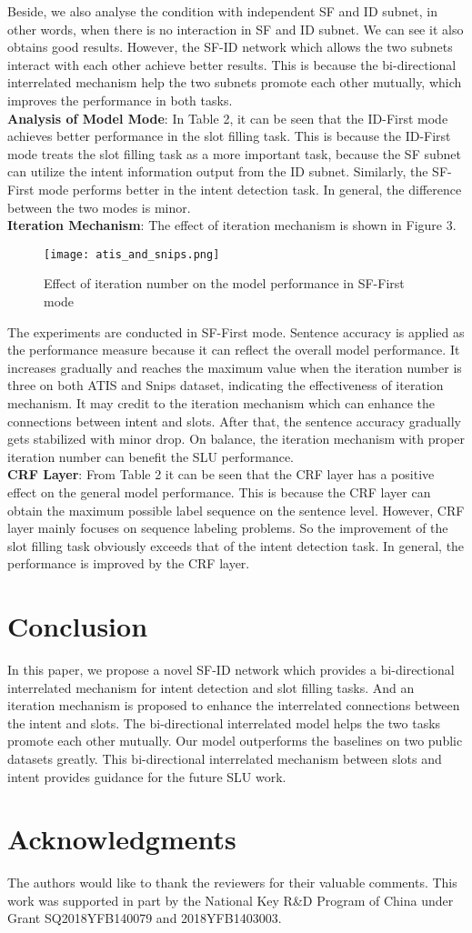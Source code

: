 \documentclass[11pt,a4paper]{article}
\begin{document}
Beside, we also analyse the condition with independent SF and ID subnet, in other words, when there is no interaction in SF and ID subnet. We can see it also obtains good results. However, the SF-ID network which allows the two subnets interact with each other achieve better results. This is because the bi-directional interrelated mechanism help the two subnets promote each other mutually, which improves the performance in both tasks.\\
\textbf{Analysis of Model Mode}: In Table 2, it can be seen that the ID-First mode achieves better performance in the slot filling task. This is because the ID-First mode treats the slot filling task as a more important task, because the SF subnet can utilize the intent information output from the ID subnet. Similarly, the SF-First mode performs better in the intent detection task. In general, the difference between the two modes is minor.\\
\textbf{Iteration Mechanism}: The effect of iteration mechanism is shown in Figure 3. 
\begin{figure}
	\centering
	\texttt{[image: atis\_and\_snips.png]}
	\caption{\label{fig:hist}Effect of iteration number on the model performance in SF-First mode}
\end{figure}
The experiments are conducted in SF-First mode. Sentence accuracy is applied as the performance measure because it can reflect the overall model performance. It increases gradually and reaches the maximum value when the iteration number is three on both ATIS and Snips dataset, indicating the effectiveness of iteration mechanism. It may credit to the iteration mechanism which can enhance the connections between intent and slots. After that, the sentence accuracy gradually gets stabilized with minor drop. On balance, the iteration mechanism with proper iteration number can benefit the SLU performance.\\
\textbf{CRF Layer}: From Table 2 it can be seen that the CRF layer has a positive effect on the general model performance. This is because the CRF layer can obtain the maximum possible label sequence on the sentence level. However, CRF layer mainly focuses on sequence labeling problems. So the improvement of the slot filling task obviously exceeds that of the intent detection task. In general, the performance is improved by the CRF layer.
\section{Conclusion}
In this paper, we propose a novel SF-ID network which provides a bi-directional interrelated mechanism for intent detection and slot filling tasks. And an iteration mechanism is proposed to enhance the interrelated connections between the intent and slots. The bi-directional interrelated model helps the two tasks promote each other mutually. Our model outperforms the baselines on two public datasets greatly. This bi-directional interrelated mechanism between slots and intent provides guidance for the future SLU work. 
\section*{Acknowledgments}
The authors would like to thank the reviewers for their valuable comments. This work was supported in part by the National Key R\&D Program of China under Grant SQ2018YFB140079 and 2018YFB1403003.


\end{document}
